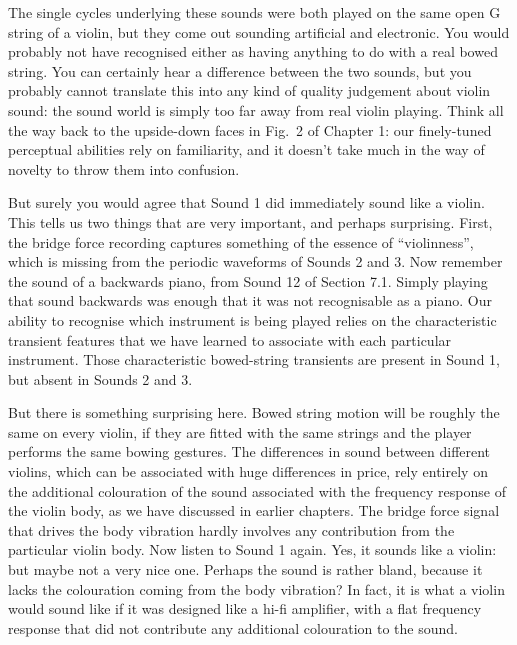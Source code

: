 \audio{}

\audio{}

  The single cycles underlying these sounds were both played on the same open G 
  string of a violin, but they come out sounding artificial and electronic. You 
  would probably not have recognised either as having anything to do with a 
  real bowed string. You can certainly hear a difference between the two 
  sounds, but you probably cannot translate this into any kind of quality 
  judgement about violin sound: the sound world is simply too far away from 
  real violin playing. Think all the way back to the upside-down faces in Fig.\ 
  2 of Chapter 1: our finely-tuned perceptual abilities rely on familiarity, 
  and it doesn’t take much in the way of novelty to throw them into confusion. 

  But surely you would agree that Sound 1 did immediately sound like a violin. 
  This tells us two things that are very important, and perhaps surprising. 
  First, the bridge force recording captures something of the essence of 
  “violinness”, which is missing from the periodic waveforms of Sounds 2 and 3. 
  Now remember the sound of a backwards piano, from Sound 12 of Section 7.1. 
  Simply playing that sound backwards was enough that it was not recognisable 
  as a piano. Our ability to recognise which instrument is being played relies 
  on the characteristic transient features that we have learned to associate 
  with each particular instrument. Those characteristic bowed-string transients 
  are present in Sound 1, but absent in Sounds 2 and 3. 

  But there is something surprising here. Bowed string motion will be roughly 
  the same on every violin, if they are fitted with the same strings and the 
  player performs the same bowing gestures. The differences in sound between 
  different violins, which can be associated with huge differences in price, 
  rely entirely on the additional colouration of the sound associated with the 
  frequency response of the violin body, as we have discussed in earlier 
  chapters. The bridge force signal that drives the body vibration hardly 
  involves any contribution from the particular violin body. Now listen to 
  Sound 1 again. Yes, it sounds like a violin: but maybe not a very nice one. 
  Perhaps the sound is rather bland, because it lacks the colouration coming 
  from the body vibration? In fact, it is what a violin would sound like if it 
  was designed like a hi-fi amplifier, with a flat frequency response that did 
  not contribute any additional colouration to the sound. 

